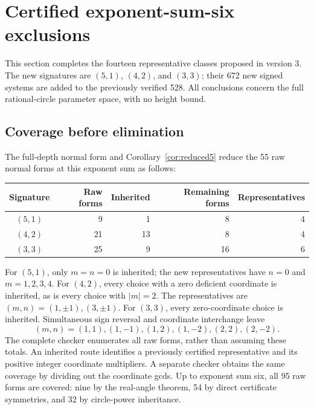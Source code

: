 \section{Certified exponent-sum-six exclusions}\label{sec:degree6}
This section completes the fourteen representative classes proposed in version 3. The new signatures are $(5,1)$, $(4,2)$, and $(3,3)$; their 672 new signed systems are added to the previously verified 528. All conclusions concern the full rational-circle parameter space, with no height bound.

\subsection{Coverage before elimination}
The full-depth normal form and Corollary~\ref{cor:reduced5} reduce the 55 raw normal forms at this exponent sum as follows:
\begin{center}
\begin{tabular}{crrrr}
\toprule
Signature & Raw forms & Inherited & Remaining forms & Representatives\\
\midrule
$(5,1)$ & 9 & 1 & 8 & 4\\
$(4,2)$ & 21 & 13 & 8 & 4\\
$(3,3)$ & 25 & 9 & 16 & 6\\
\bottomrule
\end{tabular}
\end{center}
For $(5,1)$, only $m=n=0$ is inherited; the new representatives have $n=0$ and $m=1,2,3,4$. For $(4,2)$, every choice with a zero deficient coordinate is inherited, as is every choice with $|m|=2$. The representatives are $(m,n)=(1,\pm1),(3,\pm1)$. For $(3,3)$, every zero-coordinate choice is inherited. Simultaneous sign reversal and coordinate interchange leave
\[
(m,n)=(1,1),(1,-1),(1,2),(1,-2),(2,2),(2,-2).
\]
The complete checker enumerates all raw forms, rather than assuming these totals. An inherited route identifies a previously certified representative and its positive integer coordinate multipliers. A separate checker obtains the same coverage by dividing out the coordinate gcds. Up to exponent sum six, all 95 raw forms are covered: nine by the real-angle theorem, 54 by direct certificate symmetries, and 32 by circle-power inheritance.


